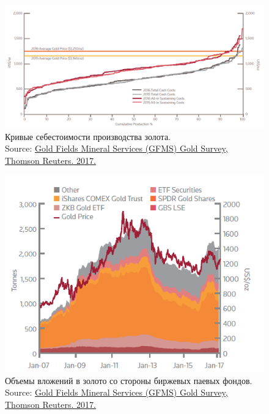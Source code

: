 \documentclass[_Banking_p3.tex]{subfiles}
\begin{document}
\begin{frame}{}
\begin{figure}	
	\centering
	\includegraphics[scale=0.4]{img/gold_cost_curves.png}
	\caption{Кривые себестоимости производства золота. \\Source: \href{http://financial-risk-solutions.thomsonreuters.info/GFMS}{Gold Fields Mineral Services (GFMS) Gold Survey, Thomson Reuters. 2017.}}
	\label{fig:gold_cost_curves}
\end{figure}
\end{frame}

\begin{frame}[shrink=20]{}
\begin{figure}	
	\centering
	\includegraphics[scale=0.7]{img/gold_etfs.png}
	\caption{Объемы вложений в золото со стороны биржевых паевых фондов. \\Source: \href{http://financial-risk-solutions.thomsonreuters.info/GFMS}{Gold Fields Mineral Services (GFMS) Gold Survey, Thomson Reuters. 2017.}}
	\label{fig:gold_etfs}
\end{figure}
\end{frame}
\end{document}
